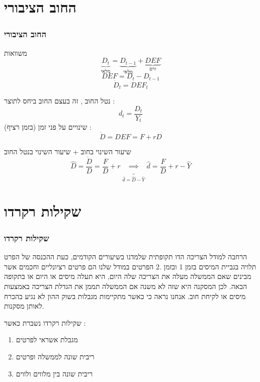 \documentclass[usenames,dvipsnames]{beamer}
\begin{document}
\begin{RTL}
\section{החוב הציבורי}
\begin{frame}[allowframebreaks]
    \frametitle{החוב הציבורי}
    \begin{block}{משוואות}
        \begin{equation*}
            \underbrace{D_t}_{\text{מלאי}} = \underbrace{D_{t-1}}_{\text{מלאי}} + \underbrace{DEF}_{\text{זרם}}
        \end{equation*}
        \begin{equation*}
            DEF = D_t - D_{t-1}
        \end{equation*}
        \begin{equation*}
            \dot D_t = DEF_t
        \end{equation*}
    \end{block}

    נטל החוב , זה בעצם החוב ביחס לתוצר :
    \[d_t = \frac{D_t}{Y_t}\]
    שינויים על פני זמן (בזמן רציף) : 
    \[\dot D = DEF  = F + rD\]
    \begin{block}{שיעור השינוי בחוב + שיעור השינוי בנטל החוב }
    \[\widehat D = \frac{\dot D }{D } = \frac{F}{D} + r  \underbrace{\implies}_{\widehat d = \widehat D - \widehat Y} \widehat d  = \frac{F}{D} + r - \widehat{Y} \]
        
    \end{block}
\end{frame}
\section{שקילות רקרדו}
\begin{frame}[allowframebreaks]
    \frametitle{שקילות רקרדו}
    הרחבה למודל הצריכה הדו תקופתית שלמדנו בשיעורים הקודמים, כעת ההכנסה של הפרט תלויה
בגביית המיסים בזמן 1 ובזמן .2 הפרטים במודל שלנו הם פרטים רציונליים וחכמים אשר מבינים
שאם הממשלה מעלה את הצריכה שלה היום, היא תעלה מיסים או היום או בתקופה הבאה. לכן
המסקנה היא שזה לא משנה אם הממשלה תממן את הגדלת הצריכה באמצעות מיסים או לקיחת
חוב. אנחנו נראה כי כאשר מתקיימות מגבלות בשוק ההון לא נגיע בהכרח לאותן מסקנות.
    
\framebreak
\begin{alertblock}{שקילות רקרדו נשברת כאשר : }
    
\begin{enumerate}
    \item מגבלת אשראי לפרטים
    \item ריבית שונה לממשלה ופרטים
    \item ריבית שונה בין מלווים ולווים
\end{enumerate}
\end{alertblock}

\end{frame}
\end{RTL}
\end{document}
